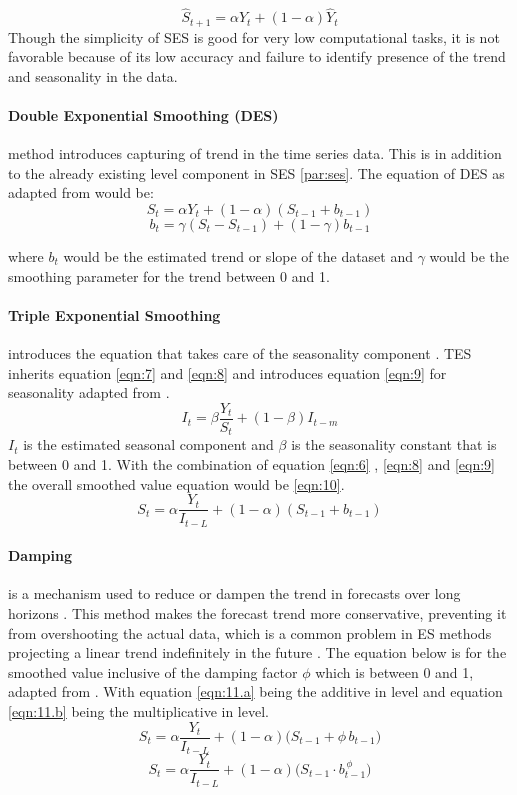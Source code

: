 \[
\hat{S}_{t+1}  = \alpha Y_t + (1-\alpha)\hat{Y}_t
\label{eqn:6}
\]
 Though the simplicity of SES is good for very low computational tasks, it is not favorable because of its low accuracy and failure to identify presence of the trend and seasonality in the data.
 
 \paragraph{Double Exponential Smoothing (DES)} method introduces capturing of trend in the time series data. This is in addition to the already existing level component in SES \ref{par:ses}. The equation of DES as adapted from \cite{nist_double_exp_smoothing} would be:
 \[
  S_t = \alpha Y_t + (1-\alpha)(S_{t-1} + b_{t-1})
 \label{eqn:7}
 \] 
 \[
  b_t = \gamma (S_t - S_{t-1}) + (1-\gamma) b_{t-1}
 \label{eqn:8}
 \]

 where $b_t$ would be the estimated trend or slope of the dataset and $\gamma$ would be the smoothing parameter for the trend  between 0 and 1. 
 \paragraph{Triple Exponential Smoothing }introduces the equation that takes care of the seasonality component \cite{nist_double_exp_smoothing}. TES inherits equation \ref{eqn:7} and \ref{eqn:8} and introduces equation \ref{eqn:9} for seasonality adapted from \cite{nist_double_exp_smoothing}.
 \[
 I_t = \beta \frac{Y_t}{S_t} + (1-\beta) I_{t-m}  
 \label{eqn:9}
 \]
 $I_t$ is the estimated seasonal component and $\beta$ is the seasonality constant that is between 0 and 1. With the combination of equation \ref{eqn:6} , \ref{eqn:8}  and \ref{eqn:9} the overall smoothed value equation would be \ref{eqn:10}. 
 \[
 S_t = \alpha \frac{Y_t}{I_{t-L}} + (1-\alpha)(S_{t-1}+b_{t-1})
 \label{eqn:10}
 \]
 
 \paragraph{Damping} is a mechanism used to reduce or dampen the trend in forecasts over long horizons \cite{taylor2003exponential}. This method makes the forecast trend more conservative, preventing it from overshooting the actual data, which is a common problem in ES methods projecting a linear trend indefinitely in the future \cite{taylor2003exponential}. The equation below is for the smoothed value inclusive of the damping factor $\phi$ which is between 0 and 1, adapted from \cite{taylor2003exponential}. With equation \ref{eqn:11.a} being the additive in level and equation \ref{eqn:11.b} being the multiplicative in level.
 \[
 	S_t = \alpha \frac{Y_t}{I_{t-L}} + (1-\alpha)\bigl(S_{t-1} + \phi\, b_{t-1}) 
 \label{eqn:11.a}
 \] 
 \[
 S_t = \alpha \frac{Y_t}{I_{t-L}} + (1-\alpha)\bigl(S_{t-1} \cdot b_{t-1}^{\,\phi}\bigr)
 \label{eqn:11.b}
 \]
 

